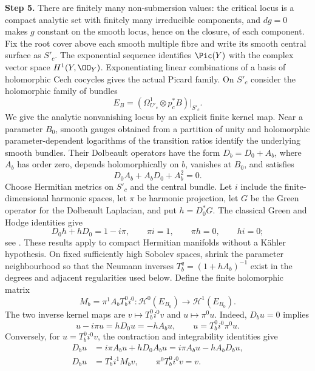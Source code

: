 \noindent\textbf{Step 5.} There are finitely many non-submersion values: the critical locus is a compact analytic set with finitely many irreducible components, and $dg=0$ makes $g$ constant on the smooth locus, hence on the closure, of each component. Fix the root cover above each smooth multiple fibre and write its smooth central surface as $S'_c$. The exponential sequence identifies $\Pic(Y)$ with the complex vector space $H^1(Y,\OO_Y)$. Exponentiating linear combinations of a basis of holomorphic Cech cocycles gives the actual Picard family. On $S'_c$ consider the holomorphic family of bundles
\[
 E_B=(\Omega^1_{U'_c}\otimes p_c^*B)|_{S'_c}.
\]
We give the analytic nonvanishing locus by an explicit finite kernel map. Near a parameter $B_0$, smooth gauges obtained from a partition of unity and holomorphic parameter-dependent logarithms of the transition ratios identify the underlying smooth bundles. Their Dolbeault operators have the form $D_b=D_0+A_b$, where $A_b$ has order zero, depends holomorphically on $b$, vanishes at $B_0$, and satisfies
\[
 D_0A_b+A_bD_0+A_b^2=0.
\]
Choose Hermitian metrics on $S'_c$ and the central bundle. Let $i$ include the finite-dimensional harmonic spaces, let $\pi$ be harmonic projection, let $G$ be the Green operator for the Dolbeault Laplacian, and put $h=D_0^*G$. The classical Green and Hodge identities give
\[
 D_0h+hD_0=1-i\pi,\qquad \pi i=1,
 \qquad \pi h=0,\qquad hi=0;
\]
see \cite[Part~I, Theorem~3.15, author-PDF body p.~15, and Theorems~7.1--7.2, body p.~32]{DemaillyHodgeAuthor2002}. These results apply to compact Hermitian manifolds without a K\"ahler hypothesis. On fixed sufficiently high Sobolev spaces, shrink the parameter neighbourhood so that the Neumann inverses $T_b^q=(1+hA_b)^{-1}$ exist in the degrees and adjacent regularities used below. Define the finite holomorphic matrix
\[
 M_b=\pi^1 A_b T_b^0 i^0:
 \mathcal H^0(E_{B_0})\longrightarrow\mathcal H^1(E_{B_0}).
\]
The two inverse kernel maps are $v\mapsto T_b^0i^0v$ and $u\mapsto\pi^0u$. Indeed, $D_bu=0$ implies
\[
 u-i\pi u=hD_0u=-hA_bu,
 \qquad u=T_b^0i^0\pi^0u.
\]
Conversely, for $u=T_b^0i^0v$, the contraction and integrability identities give
\[
 \begin{aligned}
 D_bu&=i\pi A_bu+hD_0A_bu
       =i\pi A_bu-hA_bD_bu,\\
 D_bu&=T_b^1i^1M_bv,\qquad
 \pi^0T_b^0i^0v=v.
 \end{aligned}
\]
